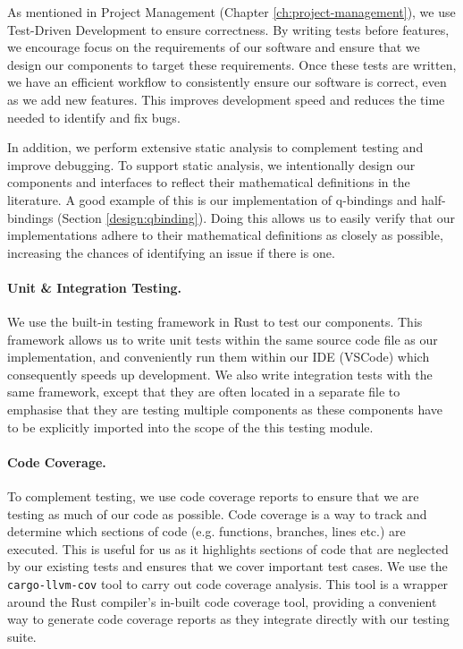 As mentioned in Project Management (Chapter \ref{ch:project-management}), we use Test-Driven Development to 
ensure correctness. By writing tests before features, we encourage focus on the 
requirements of our software and ensure that we design our components to target 
these requirements. Once these tests are written, we have an efficient workflow to 
consistently ensure our software is correct, even as we add new features. This improves
development speed and reduces the time needed to identify and fix bugs.

In addition, we perform extensive static analysis to complement testing and improve 
debugging. To support static analysis, we 
intentionally design our components and interfaces to reflect their 
mathematical definitions in the literature. A good example of this is our implementation of q-bindings and half-bindings
(Section \ref{design:qbinding}). Doing this allows us to easily verify that our implementations
adhere to their mathematical definitions as closely as possible, increasing the chances of 
identifying an issue if there is one.

\paragraph{Unit \& Integration Testing.}
We use the built-in testing framework in Rust to test our components. This framework allows us to write unit 
tests within the same source code file as our implementation, and conveniently run them within our 
IDE (VSCode) which consequently speeds up development. We also write integration tests with 
the same framework, except that they are often located in a separate file to emphasise that they are testing 
multiple components as these components have to be explicitly imported into the scope of the this testing module. 

\paragraph{Code Coverage.} To complement testing, we use code coverage reports to ensure that we are testing 
as much of our code as possible. Code coverage is a way to track and determine which sections of code (e.g. 
functions, branches, lines etc.) are executed. This is useful for us as it highlights sections of code that 
are neglected by our existing tests and ensures that we cover important test cases. We use the 
\texttt{cargo-llvm-cov} \cite{cargo-llvm-cov} tool to carry out code coverage analysis. 
This tool is a wrapper around the Rust compiler's in-built code coverage tool, 
providing a convenient way to generate code coverage reports as they integrate directly 
with our testing suite. 

